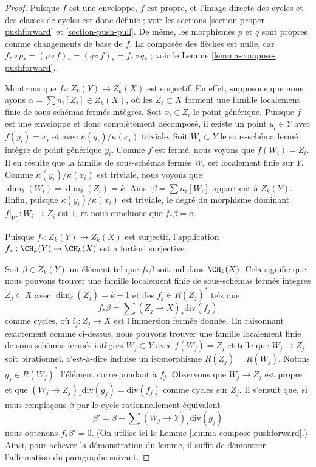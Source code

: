 \begin{proof}
Puisque $f$ est une enveloppe, $f$ est propre, et l'image directe des
cycles et des classes de cycles est donc définie ; voir les
sections \ref{section-proper-pushforward} et \ref{section-push-pull}.
De même, les morphismes $p$ et $q$ sont propres comme changements de base de $f$.
La composée des flèches est nulle, car
$f_* \circ p_* = (p \circ f)_* = (q \circ f)_* = f_* \circ q_*$ ; voir le
Lemme \ref{lemma-compose-pushforward}.

\medskip\noindent
Montrons que $f_* : Z_k(Y) \to Z_k(X)$ est surjectif.
En effet, supposons que nous ayons $\alpha = \sum n_i[Z_i] \in Z_k(X)$,
où les $Z_i \subset X$ forment une famille localement finie de sous-schémas
fermés intègres. Soit $x_i \in Z_i$ le point générique.
Puisque $f$ est une enveloppe et donc complètement décomposé,
il existe un point $y_i \in Y$ avec $f(y_i) = x_i$
et avec $\kappa(y_i)/\kappa(x_i)$ triviale. Soit $W_i \subset Y$
le sous-schéma fermé intègre de point générique $y_i$.
Comme $f$ est fermé, nous voyons que $f(W_i) = Z_i$.
Il en résulte que la famille de sous-schémas fermés $W_i$ est localement finie
sur $Y$. Comme $\kappa(y_i)/\kappa(x_i)$ est triviale, nous voyons
que $\dim_\delta(W_i) = \dim_\delta(Z_i) = k$. Ainsi
$\beta = \sum n_i[W_i]$ appartient à $Z_k(Y)$. Enfin, puisque
$\kappa(y_i)/\kappa(x_i)$ est triviale, le degré du morphisme dominant
$f|_{W_i} : W_i \to Z_i$ est $1$, et nous concluons
que $f_*\beta = \alpha$.

\medskip\noindent
Puisque $f_* : Z_k(Y) \to Z_k(X)$ est surjectif, l'application
$f_* : \CH_k(Y) \to \CH_k(X)$ est a fortiori surjective.

\medskip\noindent
Soit $\beta \in Z_k(Y)$ un élément tel que $f_*\beta$ soit nul dans
$\CH_k(X)$. Cela signifie que nous pouvons trouver une famille localement finie de
sous-schémas fermés intègres $Z_j \subset X$ avec $\dim_\delta(Z_j) = k + 1$
et des $f_j \in R(Z_j)^*$ tels que
$$
f_*\beta = \sum (Z_j \to X)_*\text{div}(f_j)
$$
comme cycles, où $i_j : Z_j \to X$ est l'immersion fermée donnée.
En raisonnant exactement comme ci-dessus, nous pouvons trouver une famille
localement finie de sous-schémas fermés intègres $W_j \subset Y$
avec $f(W_j) = Z_j$ et telle que $W_j \to Z_j$ soit birationnel, c'est-à-dire
induise un isomorphisme $R(Z_j) = R(W_j)$. Notons $g_j \in R(W_j)^*$
l'élément correspondant à $f_j$. Observons que $W_j \to Z_j$
est propre et que $(W_j \to Z_j)_*\text{div}(g_j) = \text{div}(f_j)$
comme cycles sur $Z_j$. Il s'ensuit que, si nous remplaçons
$\beta$ par le cycle rationnellement équivalent
$$
\beta' = \beta - \sum (W_j \to Y)_*\text{div}(g_j)
$$
nous obtenons $f_*\beta' = 0$.
(On utilise ici le Lemme \ref{lemma-compose-pushforward}.)
Ainsi, pour achever la démonstration
du lemme, il suffit de démontrer l'affirmation du paragraphe suivant.


\end{proof}
